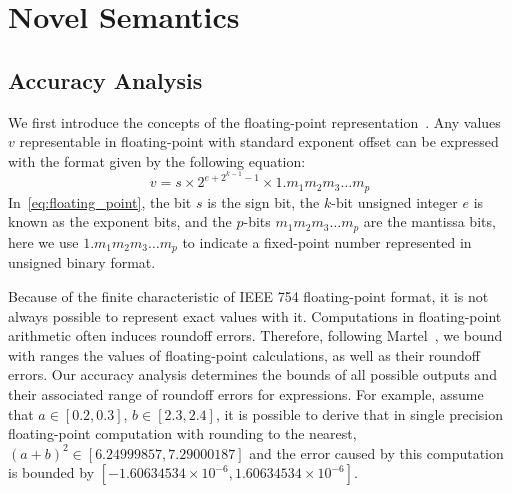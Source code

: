 \section{Novel Semantics}
\label{sec:semantics}

\subsection{Accuracy Analysis}

We first introduce the concepts of the floating-point
representation~\cite{ieee754}. Any values $v$ representable in floating-point
with standard exponent offset can be expressed with the format given by the
following equation:
\begin{equation}
    v = s \times 2^{e + 2^{k - 1} - 1} \times 1.{m_1 m_2 m_3 \ldots m_p}
    \label{eq:floating_point}
\end{equation}
In~\eqref{eq:floating_point}, the bit $s$ is the sign bit, the $k$-bit unsigned
integer $e$ is known as the exponent bits, and the $p$-bits $m_1 m_2 m_3
\ldots m_p$ are the mantissa bits, here we use $1.{m_1 m_2 m_3 \ldots m_p}$ to
indicate a fixed-point number represented in unsigned binary format.

Because of the finite characteristic of IEEE 754 floating-point format, it
is not always possible to represent exact values with it. Computations in
floating-point arithmetic often induces roundoff errors. Therefore, following
Martel~\cite{martel07}, we bound with ranges the values of floating-point
calculations, as well as their roundoff errors. Our accuracy analysis
determines the bounds of all possible outputs and their associated range
of roundoff errors for expressions. For example, assume that $a \in [0.2,
0.3]$, $b \in [2.3, 2.4]$, it is possible to derive that in single precision
floating-point computation with rounding to the nearest, ${(a + b)}^2 \in
[6.24999857, 7.29000187]$ and the error caused by this computation is bounded
by $[-1.60634534\times10^{-6}, 1.60634534\times10^{-6}]$.

